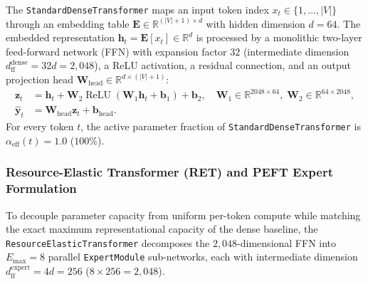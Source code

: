 \documentclass{interact}
\begin{document}
The \texttt{StandardDenseTransformer} maps an input token index $x_t \in \{1, \dots, |V|\}$ through an embedding table $\mathbf{E} \in \mathbb{R}^{(|V|+1) \times d}$ with hidden dimension $d = 64$. The embedded representation $\mathbf{h}_t = \mathbf{E}[x_t] \in \mathbb{R}^{d}$ is processed by a monolithic two-layer feed-forward network (FFN) with expansion factor $32$ (intermediate dimension $d_{\text{ff}}^{\text{dense}} = 32d = 2,048$), a ReLU activation, a residual connection, and an output projection head $\mathbf{W}_{\text{head}} \in \mathbb{R}^{d \times (|V|+1)}$:
\begin{align}
    \mathbf{z}_t       & = \mathbf{h}_t + \mathbf{W}_2 \operatorname{ReLU}(\mathbf{W}_1 \mathbf{h}_t + \mathbf{b}_1) + \mathbf{b}_2, \quad \mathbf{W}_1 \in \mathbb{R}^{2048 \times 64}, \; \mathbf{W}_2 \in \mathbb{R}^{64 \times 2048}, \label{eq:dense_ffn} \\
    \hat{\mathbf{y}}_t & = \mathbf{W}_{\text{head}} \mathbf{z}_t + \mathbf{b}_{\text{head}}. \label{eq:dense_head}
\end{align}
For every token $t$, the active parameter fraction of \texttt{StandardDenseTransformer} is $\alpha_{\text{eff}}(t) = 1.0$ ($100\%$).

\subsubsection{Resource-Elastic Transformer (RET) and PEFT Expert Formulation}

To decouple parameter capacity from uniform per-token compute while matching the exact maximum representational capacity of the dense baseline, the \texttt{ResourceElasticTransformer} decomposes the $2,048$-dimensional FFN into $E_{\max} = 8$ parallel \texttt{ExpertModule} sub-networks, each with intermediate dimension $d_{\text{ff}}^{\text{expert}} = 4d = 256$ ($8 \times 256 = 2,048$).
\end{document}
